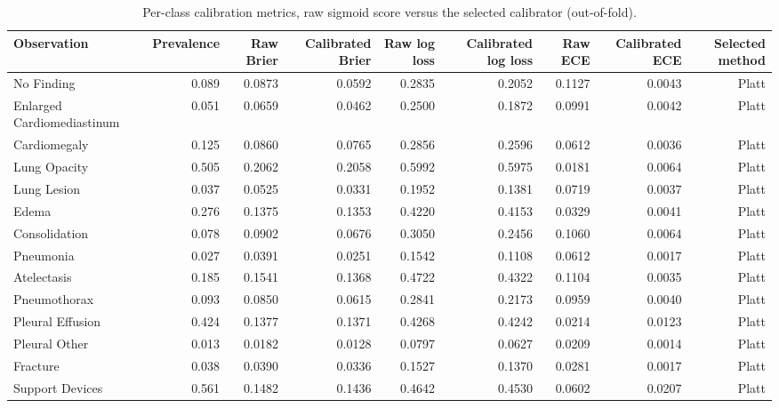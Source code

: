 \begin{table}[t]
\centering
\small
\begin{tabular}{lrrrrrrrr}
\hline
Observation & Prevalence & Raw Brier & Calibrated Brier & Raw log loss & Calibrated log loss & Raw ECE & Calibrated ECE & Selected method \\
\hline
No Finding & 0.089 & 0.0873 & 0.0592 & 0.2835 & 0.2052 & 0.1127 & 0.0043 & Platt \\
Enlarged Cardiomediastinum & 0.051 & 0.0659 & 0.0462 & 0.2500 & 0.1872 & 0.0991 & 0.0042 & Platt \\
Cardiomegaly & 0.125 & 0.0860 & 0.0765 & 0.2856 & 0.2596 & 0.0612 & 0.0036 & Platt \\
Lung Opacity & 0.505 & 0.2062 & 0.2058 & 0.5992 & 0.5975 & 0.0181 & 0.0064 & Platt \\
Lung Lesion & 0.037 & 0.0525 & 0.0331 & 0.1952 & 0.1381 & 0.0719 & 0.0037 & Platt \\
Edema & 0.276 & 0.1375 & 0.1353 & 0.4220 & 0.4153 & 0.0329 & 0.0041 & Platt \\
Consolidation & 0.078 & 0.0902 & 0.0676 & 0.3050 & 0.2456 & 0.1060 & 0.0064 & Platt \\
Pneumonia & 0.027 & 0.0391 & 0.0251 & 0.1542 & 0.1108 & 0.0612 & 0.0017 & Platt \\
Atelectasis & 0.185 & 0.1541 & 0.1368 & 0.4722 & 0.4322 & 0.1104 & 0.0035 & Platt \\
Pneumothorax & 0.093 & 0.0850 & 0.0615 & 0.2841 & 0.2173 & 0.0959 & 0.0040 & Platt \\
Pleural Effusion & 0.424 & 0.1377 & 0.1371 & 0.4268 & 0.4242 & 0.0214 & 0.0123 & Platt \\
Pleural Other & 0.013 & 0.0182 & 0.0128 & 0.0797 & 0.0627 & 0.0209 & 0.0014 & Platt \\
Fracture & 0.038 & 0.0390 & 0.0336 & 0.1527 & 0.1370 & 0.0281 & 0.0017 & Platt \\
Support Devices & 0.561 & 0.1482 & 0.1436 & 0.4642 & 0.4530 & 0.0602 & 0.0207 & Platt \\
\hline
\end{tabular}
\caption{Per-class calibration metrics, raw sigmoid score versus the selected calibrator (out-of-fold).}
\label{tab:table2_per_class_raw_vs_calibrated}
\end{table}
